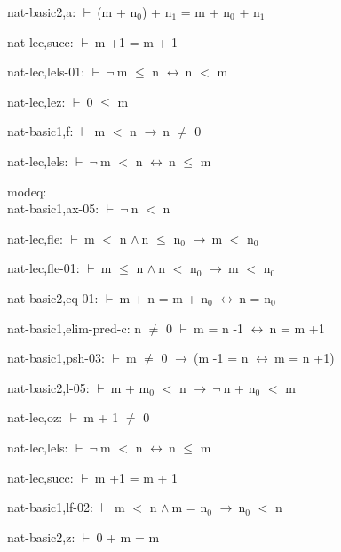 \documentclass[a4paper]{article}
\newcommand{\Fol}{\mbox{$\vdash\ $}}
\newcommand{\Not}{\mbox{$\neg\ $}}
\newcommand{\And}{\mbox{$\wedge\ $}}
\newcommand{\Imp}{\mbox{$\rightarrow\ $}}
\newcommand{\Equiv}{\mbox{$\leftrightarrow\ $}}
\begin{document}
nat-basic2,a: 
 \Fol (m + $\mbox{n}_{0}$) + $\mbox{n}_{1}$ = m + $\mbox{n}_{0}$ + $\mbox{n}_{1}$



nat-lec,succ: 
 \Fol m +1 = m + 1



nat-lec,lels-01: 
 \Fol \Not m $\le$ n \Equiv n $<$ m



nat-lec,lez: 
 \Fol 0 $\le$ m



nat-basic1,f: 
 \Fol m $<$ n \Imp n $\neq$ 0



nat-lec,lels: 
 \Fol \Not m $<$ n \Equiv n $\le$ m



\bigskip

modeq:\\ nat-basic1,ax-05: 
 \Fol \Not n $<$ n



nat-lec,fle: 
 \Fol m $<$ n \And n $\le$ $\mbox{n}_{0}$ \Imp m $<$ $\mbox{n}_{0}$



nat-lec,fle-01: 
 \Fol m $\le$ n \And n $<$ $\mbox{n}_{0}$ \Imp m $<$ $\mbox{n}_{0}$



nat-basic2,eq-01: 
 \Fol m + n = m + $\mbox{n}_{0}$ \Equiv n = $\mbox{n}_{0}$



nat-basic1,elim-pred-c: 
n $\neq$ 0
 \Fol m = n -1 \Equiv n = m +1



nat-basic1,psh-03: 
 \Fol m $\neq$ 0 \Imp (m -1 = n \Equiv m = n +1)



nat-basic2,l-05: 
 \Fol m + $\mbox{m}_{0}$ $<$ n \Imp \Not n + $\mbox{n}_{0}$ $<$ m



nat-lec,oz: 
 \Fol m + 1 $\neq$ 0



nat-lec,lels: 
 \Fol \Not m $<$ n \Equiv n $\le$ m



nat-lec,succ: 
 \Fol m +1 = m + 1



nat-basic1,lf-02: 
 \Fol m $<$ n \And m = $\mbox{n}_{0}$ \Imp $\mbox{n}_{0}$ $<$ n



nat-basic2,z: 
 \Fol 0 + m = m
\end{document}

